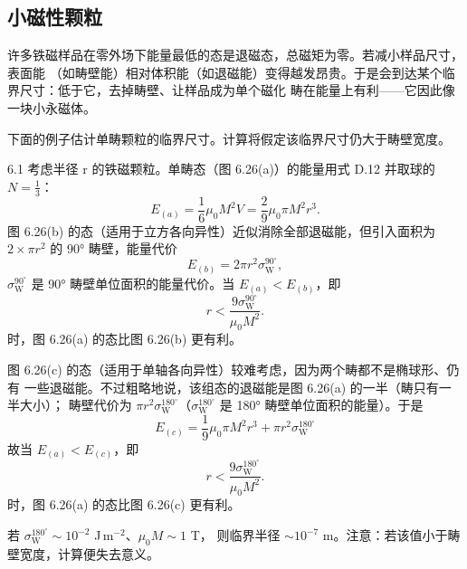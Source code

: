 \subsection{小磁性颗粒}

许多铁磁样品在零外场下能量最低的态是退磁态，总磁矩为零。若减小样品尺寸，表面能
（如畴壁能）相对体积能（如退磁能）变得越发昂贵。于是会到达某个临界尺寸：低于它，去掉畴壁、让样品成为单个磁化
畴在能量上有利——它因此像一块小永磁体。

下面的例子估计单畴颗粒的临界尺寸。计算将假定该临界尺寸仍大于畴壁宽度。

\begin{example}{6.1}
考虑半径 r 的铁磁颗粒。单畴态（图 6.26(a)）的能量用式 D.12 并取球的
$N=\frac{1}{3}$：
\begin{equation*}
E_{(a)} = \frac{1}{6}\mu_0M^{2}V = \frac{2}{9}\mu_0\pi M^{2}r^{3}.\tag{6.50}
\end{equation*}
图 6.26(b) 的态（适用于立方各向异性）近似消除全部退磁能，但引入面积为
$2\times\pi r^{2}$ 的 90° 畴壁，能量代价
\begin{equation*}
E_{(b)} = 2\pi r^{2}\sigma_{\mathrm{W}}^{90^{\circ}},\tag{6.51}
\end{equation*}
$\sigma_{\mathrm{W}}^{90^{\circ}}$ 是 90° 畴壁单位面积的能量代价。当
$E_{(a)}<E_{(b)}$，即
\begin{equation*}
r < \frac{9\sigma_{\mathrm{W}}^{90^{\circ}}}{\mu_0M^{2}}.\tag{6.52}
\end{equation*}
时，图 6.26(a) 的态比图 6.26(b) 更有利。

图 6.26(c) 的态（适用于单轴各向异性）较难考虑，因为两个畴都不是椭球形、仍有
一些退磁能。不过粗略地说，该组态的退磁能是图 6.26(a) 的一半（畴只有一半大小）；
畴壁代价为 $\pi r^{2}\sigma_{\mathrm{W}}^{180^{\circ}}$（$\sigma_{\mathrm{W}}^{180^{\circ}}$
是 180° 畴壁单位面积的能量）。于是
\begin{equation*}
E_{(c)} = \frac{1}{9}\mu_0\pi M^{2}r^{3} + \pi r^{2}\sigma_{\mathrm{W}}^{180^{\circ}}\tag{6.53}
\end{equation*}
故当 $E_{(a)}<E_{(c)}$，即
\begin{equation*}
r < \frac{9\sigma_{\mathrm{W}}^{180^{\circ}}}{\mu_0M^{2}}.\tag{6.54}
\end{equation*}
时，图 6.26(a) 的态比图 6.26(c) 更有利。

若 $\sigma_{\mathrm{W}}^{180^{\circ}}\sim10^{-2}$ J\,m$^{-2}$、$\mu_0M\sim1$ T，
则临界半径 $\sim10^{-7}$ m。注意：若该值小于畴壁宽度，计算便失去意义。
\end{example}

